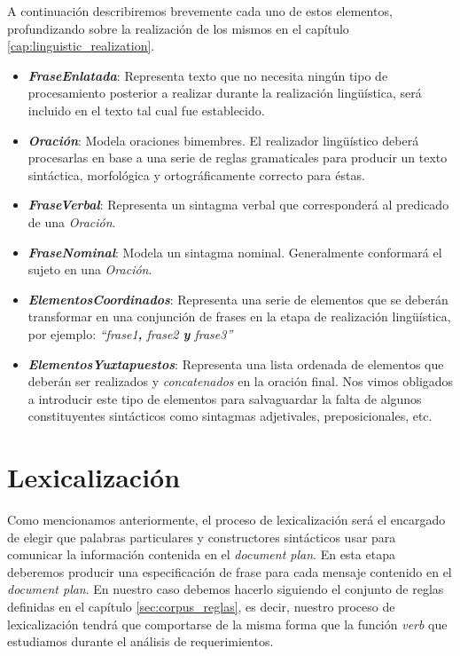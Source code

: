A continuación describiremos brevemente cada uno de estos elementos, profundizando sobre la realización de los mismos en el capítulo \ref{cap:linguistic_realization}.


\medskip
\begin{itemize}
\item{\emph{\textbf{FraseEnlatada}}: Representa texto que no necesita ningún tipo de procesamiento posterior a realizar durante la realización lingüística, será incluido en el texto tal cual fue establecido.}
\item{\emph{\textbf{Oración}}: Modela oraciones bimembres. El realizador lingüístico deberá procesarlas en base a una serie de reglas gramaticales para producir un texto sintáctica, morfológica y ortográficamente correcto para éstas.}
\item{\emph{\textbf{FraseVerbal}}: Representa un sintagma verbal que corresponderá al predicado de una \emph{Oración}.}
\item{\emph{\textbf{FraseNominal}}: Modela un sintagma nominal. Generalmente conformará el sujeto en una \emph{Oración}.}
\item{\emph{\textbf{ElementosCoordinados}}: Representa una serie de elementos que se deberán transformar en una conjunción de frases en la etapa de realización lingüística, por ejemplo: \emph{``frase1\textbf{,} frase2 \textbf{y} frase3''}}
\item{\emph{\textbf{ElementosYuxtapuestos}}: Representa una lista ordenada de elementos que deberán ser realizados y \emph{concatenados} en la oración final. Nos vimos obligados a introducir este tipo de elementos para salvaguardar la falta de algunos constituyentes sintácticos como sintagmas adjetivales, preposicionales, etc.}
\end{itemize}



\section{Lexicalización}
\label{sec:microplanning_lexicalization}

Como mencionamos anteriormente, el proceso de lexicalización será el encargado de elegir que palabras particulares y constructores sintácticos usar para comunicar la información contenida en el \textit{document plan}. En esta etapa deberemos producir una especificación de frase para cada mensaje contenido en el \textit{document plan}. En nuestro caso debemos hacerlo siguiendo el conjunto de reglas definidas en el capítulo \ref{sec:corpus_reglas}, es decir, nuestro proceso de lexicalización tendrá que comportarse de la misma forma que la función \emph{verb} que estudiamos durante el análisis de requerimientos.

